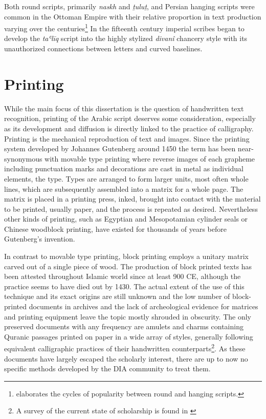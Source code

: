 Both round scripts, primarily \emph{naskh} and \emph{ṯuluṯ}, and Persian
hanging scripts were common in the Ottoman Empire with their relative
proportion in text production varying over the centuries\footnote{\cite[chapter
XI]{blair2006islamic} elaborates the cycles of popularity between round and
hanging scripts.} In the fifteenth century imperial scribes began to develop
the \emph{taʿlīq} script into the highly stylized \emph{divanî} chancery style
with its unauthorized connections between letters and curved baselines.

\section{Printing}

While the main focus of this dissertation is the question of handwritten text
recognition, printing of the Arabic script deserves some consideration,
especially as its development and diffusion is directly linked to the practice
of calligraphy. Printing is the mechanical reproduction of text and images.
Since the printing system developed by Johannes Gutenberg around 1450 the term
has been near-synonymous with movable type printing where reverse images of
each grapheme including punctuation marks and decorations are cast in metal as
individual elements, the type. Types are arranged to form larger units, most
often whole lines, which are subsequently assembled into a matrix for a whole
page. The matrix is placed in a printing press, inked, brought into contact
with the material to be printed, usually paper, and the process is repeated as
desired. Nevertheless other kinds of printing, such as Egyptian and
Mesopotamian cylinder seals or Chinese woodblock printing, have existed for
thousands of years before Gutenberg's invention. 

In contrast to movable type printing, block printing employs a unitary matrix
carved out of a single piece of wood. The production of block printed texts has
been attested throughout Islamic world since at least 900 CE, although the
practice seems to have died out by 1430. The actual extent of the use of this
technique and its exact origins are still unknown and the low number of
block-printed documents in archives and the lack of archeological evidence for
matrices and printing equipment leave the topic mostly shrouded in obscurity.
The only preserved documents with any frequency are amulets and charms
containing Quranic passages printed on paper in a wide array of styles,
generally following equivalent calligraphic practices of their handwritten
counterparts\footnote{A survey of the current state of scholarship is found in
\cite{schaefer2006enigmatic}}. As these documents have largely escaped the
scholarly interest, there are up to now no specific methods developed by the
DIA community to treat them.

